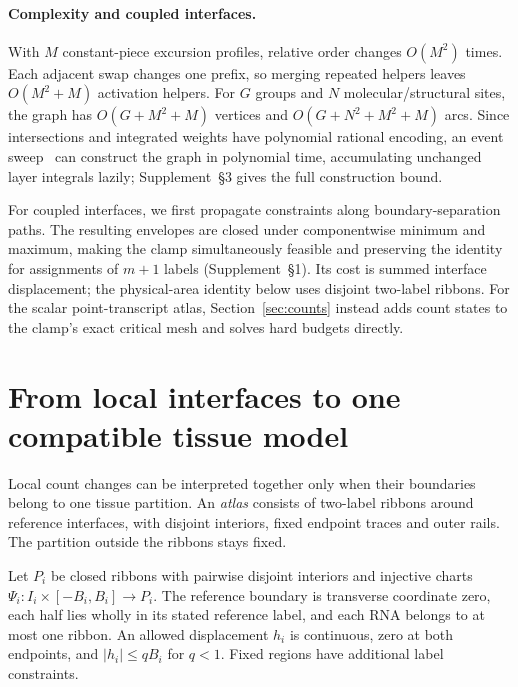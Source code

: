 \documentclass[10pt,letterpaper]{article}
\begin{document}
\paragraph{Complexity and coupled interfaces.}
With $M$ constant-piece excursion profiles, relative order changes $O(M^2)$ times. Each adjacent swap changes one prefix, so merging repeated helpers leaves $O(M^2+M)$ activation helpers. For $G$ groups and $N$ molecular/structural sites, the graph has $O(G+M^2+M)$ vertices and $O(G+N^2+M^2+M)$ arcs. Since intersections and integrated weights have polynomial rational encoding, an event sweep~\cite{bentley} can construct the graph in polynomial time, accumulating unchanged layer integrals lazily; Supplement~\S3 gives the full construction bound.

For coupled interfaces, we first propagate constraints along boundary-separation paths. The resulting envelopes are closed under componentwise minimum and maximum, making the clamp simultaneously feasible and preserving the identity for assignments of $m+1$ labels (Supplement~\S1). Its cost is summed interface displacement; the physical-area identity below uses disjoint two-label ribbons. For the scalar point-transcript atlas, Section~\ref{sec:counts} instead adds count states to the clamp's exact critical mesh and solves hard budgets directly.

\section{From local interfaces to one compatible tissue model}\label{sec:atlas}
Local count changes can be interpreted together only when their boundaries belong to one tissue partition. An \emph{atlas} consists of two-label ribbons around reference interfaces, with disjoint interiors, fixed endpoint traces and outer rails. The partition outside the ribbons stays fixed.

Let $P_i$ be closed ribbons with pairwise disjoint interiors and injective charts $\Psi_i:I_i\times[-B_i,B_i]\to P_i$. The reference boundary is transverse coordinate zero, each half lies wholly in its stated reference label, and each RNA belongs to at most one ribbon. An allowed displacement $h_i$ is continuous, zero at both endpoints, and $|h_i|\le qB_i$ for $q<1$. Fixed regions have additional label constraints.
\end{document}
